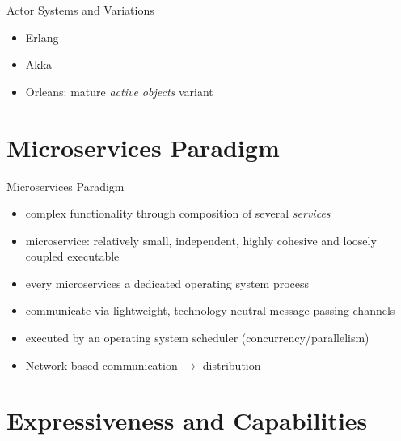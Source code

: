 \documentclass{beamer}
\begin{document}

\begin{frame}{Actor Systems and Variations}

\begin{itemize}
  \item Erlang
  \item Akka
  \item Orleans: mature \textit{active objects} variant
\end{itemize}
  

\end{frame}


\section{Microservices Paradigm}


\begin{frame}{Microservices Paradigm}

\begin{itemize}
  \item complex functionality through composition of several \textit{services}
  \item microservice: relatively small, independent, highly cohesive and loosely coupled executable
  \item every microservices a dedicated operating system process
  \item communicate via lightweight, technology-neutral message passing channels
  \item executed by an operating system scheduler (concurrency/parallelism)
  \item Network-based communication $\rightarrow$ distribution
\end{itemize}

\end{frame}


\section{Expressiveness and Capabilities}

\end{document}
